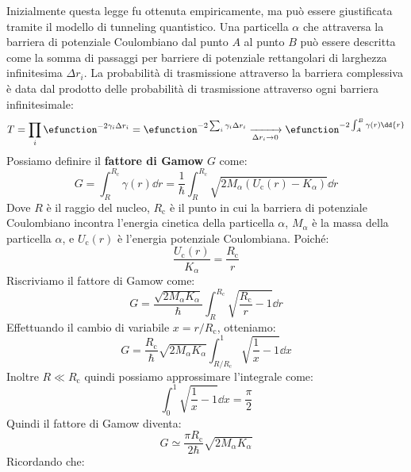 Inizialmente questa legge fu ottenuta empiricamente, ma può essere giustificata tramite il modello di tunneling quantistico. Una particella $\alpha$ che attraversa la barriera di potenziale Coulombiano dal punto $A$ al punto $B$ può essere descritta come la somma di passaggi per barriere di potenziale rettangolari di larghezza infinitesima $\Delta r_i$. La probabilità di trasmissione attraverso la barriera complessiva è data dal prodotto delle probabilità di trasmissione attraverso ogni barriera infinitesimale:
\begin{equation}
    T = \prod_i \efunction^{-2\gamma_i \Delta r_i} = \efunction^{-2\sum_i \gamma_i \Delta r_i} \xrightarrow[\Delta r_i \to 0]{} \efunction^{-2\int_A^B \gamma(r) \dd{r}}
\end{equation}
Possiamo definire il \textbf{fattore di Gamow} $G$ come:
\begin{equation}
    G = \int_R^{R_{\text{c}}} \gamma(r) \dd{r} = \frac{1}{\hbar} \int_R^{R_{\text{c}}} \sqrt{2M_{\alpha}(U_{\text{c}}(r) - K_\alpha)} \dd{r}
\end{equation}
Dove $R$ è il raggio del nucleo, $R_{\text{c}}$ è il punto in cui la barriera di potenziale Coulombiano incontra l'energia cinetica della particella $\alpha$, $M_\alpha$ è la massa della particella $\alpha$, e $U_{\text{c}}(r)$ è l'energia potenziale Coulombiana. Poiché:
\begin{equation}
    \dfrac{U_{\text{c}}(r)}{K_\alpha} = \dfrac{R_{\text{c}}}{r}
\end{equation}
Riscriviamo il fattore di Gamow come:
\begin{equation}
    G = \frac{\sqrt{2M_\alpha K_\alpha}}{\hbar} \int_R^{R_{\text{c}}} \sqrt{\dfrac{R_{\text{c}}}{r} - 1} \dd{r}
\end{equation}
Effettuando il cambio di variabile $x = r/R_{\text{c}}$, otteniamo:
\begin{equation}
    G = \frac{R_{\text{c}}}{\hbar}\sqrt{2M_\alpha K_\alpha}  \int_{R/R_{\text{c}}}^{1} \sqrt{\dfrac{1}{x} - 1} \dd{x}
\end{equation}
Inoltre $R \ll R_{\text{c}}$ quindi possiamo approssimare l'integrale come:
\begin{equation}
    \int_{0}^{1} \sqrt{\dfrac{1}{x} - 1} \dd{x} = \frac{\pi}{2}
\end{equation}
Quindi il fattore di Gamow diventa:
\begin{equation}
    G \simeq \frac{\pi R_{\text{c}}}{2\hbar} \sqrt{2M_\alpha K_\alpha}
\end{equation}
Ricordando che:
